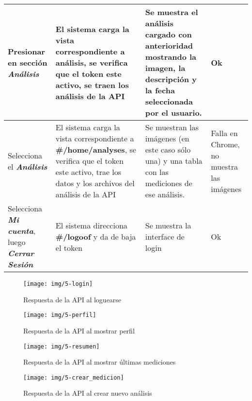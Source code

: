 \begin{longtable}{|m{3.5cm}|m{3.5cm}|m{3.5cm}|m{2.5cm}|}
Presionar en sección \textit{\textbf{Análisis }} 
& El sistema carga la vista correspondiente a análisis, se verifica que el token este activo, se traen los análisis de la API
& Se muestra el análisis cargado con anterioridad mostrando la imagen, la descripción y la fecha seleccionada por el usuario.
& Ok
\\ \hline






Selecciona el \textit{\textbf{Análisis}}
& El sistema carga la vista correspondiente a \textbf{ \#/home/analyses}, se verifica que el token este activo, trae los datos y los archivos del análisis de la API
& Se muestran las imágenes (en este caso sólo una) y una tabla con las mediciones de ese análisis.
& Falla en Chrome, no muestra las imágenes
\\ \hline




Selecciona \textit{\textbf{Mi cuenta}}, luego \textit{\textbf{Cerrar Sesión}}
& El sistema direcciona \textbf{\#/logoof } y da de baja el token
& Se muestra la interface de login
& Ok
\\ \hline


\end{longtable}







    \begin{figure}[h]
        \centering
        \texttt{[image: img/5-login]}
        \caption{Respuesta de la API al loguearse}
		\label{5-login}
    \end{figure}
    
        \begin{figure}[h]
        \centering
        \texttt{[image: img/5-perfil]}
        \caption{Respuesta de la API al mostrar perfil}
		\label{5-perfil}
    \end{figure}
    
        \begin{figure}[h]
        \centering
        \texttt{[image: img/5-resumen]}
        \caption{Respuesta de la API al mostrar últimas mediciones}
		\label{5-resumen}
    \end{figure}
    
    \begin{figure}[h]
        \centering
        \texttt{[image: img/5-crear\_medicion]}
        \caption{Respuesta de la API al crear nuevo análisis}
		\label{5-crear_medicion}
    \end{figure}
    
